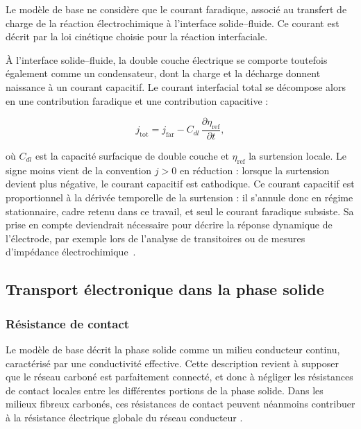 Le modèle de base ne considère que le courant faradique, associé au
transfert de charge de la réaction électrochimique à l'interface
solide--fluide. Ce courant est décrit par la loi cinétique choisie pour la
réaction interfaciale.

À l'interface solide--fluide, la double couche électrique se comporte
toutefois également comme un condensateur, dont la charge et la décharge
donnent naissance à un courant capacitif. Le courant interfacial total se
décompose alors en une contribution faradique et une contribution capacitive :

\begin{equation}
j_{\mathrm{tot}}
=
j_{\mathrm{far}}%
-
C_{dl}\,\frac{\partial \eta_{\mathrm{ref}}}{\partial t},
\end{equation}

où $C_{dl}$ est la capacité surfacique de double couche et $\eta_{\mathrm{ref}}$ la
surtension locale. Le signe moins vient de la convention $j > 0$ en réduction :
lorsque la surtension devient plus négative, le courant capacitif est cathodique. Ce courant capacitif est proportionnel à la dérivée
temporelle de la surtension : il s'annule donc en régime stationnaire, cadre
retenu dans ce travail, et seul le courant faradique subsiste. Sa prise en
compte deviendrait nécessaire pour décrire la réponse dynamique de
l'électrode, par exemple lors de l'analyse de transitoires ou de mesures
d'impédance électrochimique~\cite{bazantDiffuseChargeDynamicsElectrochemical2004, biesheuvelNonlinearDynamicsCapacitive2010}.



\subsection*{Transport électronique dans la phase solide}

\subsubsection*{Résistance de contact}

Le modèle de base décrit la phase solide comme un milieu conducteur continu,
caractérisé par une conductivité effective. Cette description revient à
supposer que le réseau carboné est parfaitement connecté, et donc à négliger
les résistances de contact locales entre les différentes portions de la phase
solide. Dans les milieux fibreux carbonés, ces résistances de contact peuvent
néanmoins contribuer à la résistance électrique globale du réseau conducteur
\cite{qiuElectricalResistanceMicrostructure2018}.

